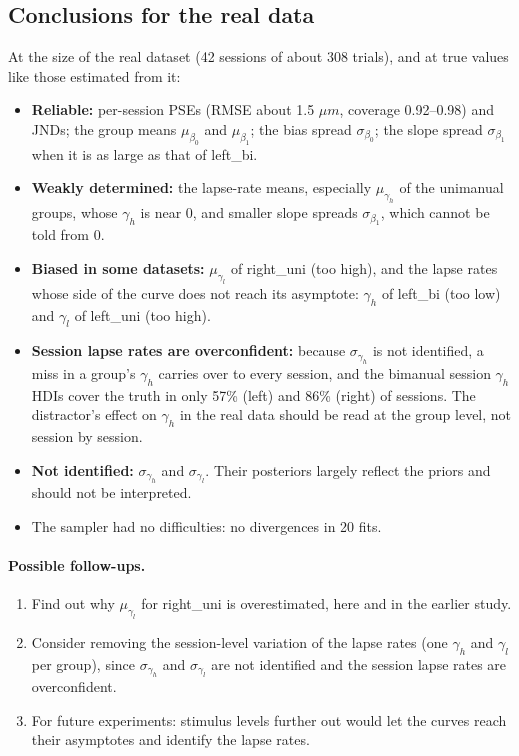 \documentclass[11pt]{article}
\begin{document}
\subsection{Conclusions for the real data}

At the size of the real dataset (42 sessions of about 308 trials), and at true values
like those estimated from it:

\begin{itemize}
  \item \textbf{Reliable:} per-session PSEs (RMSE about 1.5 $\mu m$, coverage
        0.92--0.98) and JNDs; the group means $\mu_{\beta_0}$ and $\mu_{\beta_1}$; the
        bias spread $\sigma_{\beta_0}$; the slope spread $\sigma_{\beta_1}$ when it is as
        large as that of left\_bi.
  \item \textbf{Weakly determined:} the lapse-rate means, especially $\mu_{\gamma_h}$ of the
        unimanual groups, whose $\gamma_h$ is near 0, and smaller slope spreads
        $\sigma_{\beta_1}$, which cannot be told from 0.
  \item \textbf{Biased in some datasets:} $\mu_{\gamma_l}$ of right\_uni (too high), and the
        lapse rates whose side of the curve does not reach its asymptote: $\gamma_h$ of
        left\_bi (too low) and $\gamma_l$ of left\_uni (too high).
  \item \textbf{Session lapse rates are overconfident:} because $\sigma_{\gamma_h}$ is not
        identified, a miss in a group's $\gamma_h$ carries over to every session, and the
        bimanual session $\gamma_h$ HDIs cover the truth in only 57\% (left) and 86\%
        (right) of sessions. The distractor's effect on $\gamma_h$ in the real data
        should be read at the group level, not session by session.
  \item \textbf{Not identified:} $\sigma_{\gamma_h}$ and $\sigma_{\gamma_l}$. Their posteriors
        largely reflect the priors and should not be interpreted.
  \item The sampler had no difficulties: no divergences in 20 fits.
\end{itemize}

\paragraph{Possible follow-ups.}
\begin{enumerate}
  \item Find out why $\mu_{\gamma_l}$ for right\_uni is overestimated, here and in the
        earlier study.
  \item Consider removing the session-level variation of the lapse rates (one $\gamma_h$
        and $\gamma_l$ per group), since $\sigma_{\gamma_h}$ and $\sigma_{\gamma_l}$ are
        not identified and the session lapse rates are overconfident.
  \item For future experiments: stimulus levels further out would let the curves reach
        their asymptotes and identify the lapse rates.
\end{enumerate}
\end{document}
